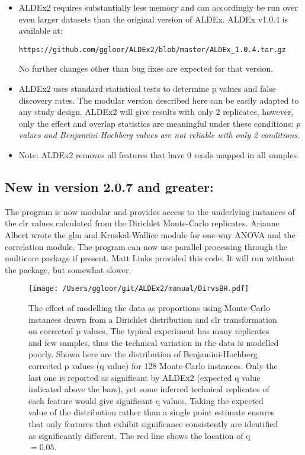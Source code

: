 \documentclass[11pt]{article}
\begin{document}
\begin{itemize}

\item ALDEx2  requires substantially less memory and can accordingly be run over even larger datasets than the original version of ALDEx. ALDEx v1.0.4 is available at: \begin{verbatim}https://github.com/ggloor/ALDEx2/blob/master/ALDEx_1.0.4.tar.gz\end{verbatim} No further changes other than bug fixes are expected for that version. 

\item ALDEx2 uses standard statistical tests to determine p values and false discovery rates. The modular version described here can be easily adapted to any study design. ALDEx2 will give results with only 2 replicates, however, only the effect and overlap statistics are meaningful under these conditions: \emph{p values and Benjamini-Hochberg values are not reliable with only 2 conditions}.

\item Note: ALDEx2 removes all features that have 0 reads mapped in all samples.
\end{itemize}

\subsection{New in version 2.0.7 and greater:} The program is now modular and provides access to the underlying instances of the clr values calculated from the Dirichlet Monte-Carlo replicates. Arianne Albert wrote the glm and Kruskal-Wallice module for one-way ANOVA and the correlation module. The program can now use parallel processing through the multicore package if present. Matt Links provided this code. It will run without the package, but somewhat slower. 

\begin{wrapfigure}{r}{0.6\textwidth}\vspace{-2cm}
\begin{center}
\texttt{[image: /Users/ggloor/git/ALDEx2/manual/DirvsBH.pdf]}
\vspace{-1cm}
\caption{The effect of modelling the data as proportions using Monte-Carlo instances drawn from a Dirichlet distribution and clr transformation on corrected p values. The typical experiment has many replicates and few samples, thus the technical variation in the data is modelled poorly. Shown here are the distribution of Benjamini-Hochberg corrected p values (q value) for 128 Monte-Carlo instances. Only the last one is reported as significant by ALDEx2 (expected q value indicated above the bars), yet some inferred technical replicates of each feature would give significant q values. Taking the expected value of the distribution rather than a single point estimate ensures that only features that exhibit significance consistently are identified as significantly different. The  red line shows the location of q\ $=0.05$. }
\label{dirvsbh}
\end{center}\vspace{-2cm}
\end{wrapfigure}
\newpage
\end{document}
